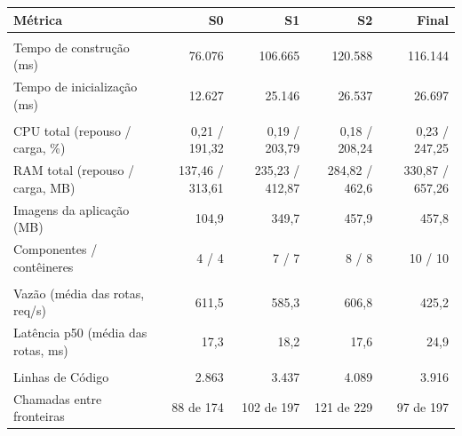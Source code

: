 \begin{quadro}[htb]
  \centering
  \caption{Leilões --- métricas por snapshot --- Subdomínio (DDD).}
  \label{qua:comp_auction_subdominio_snapshots}
  \renewcommand{\arraystretch}{1.15}
  \begin{tabularx}{\textwidth}{|>{\raggedright\arraybackslash}X|r|r|r|r|}
    \hline
    \textbf{Métrica} & \textbf{S0} & \textbf{S1} & \textbf{S2} & \textbf{Final} \\
    \hline
    \multicolumn{5}{|l|}{\textbf{Agilidade}} \\
    \hline
    Tempo de construção (ms) & 76.076 & 106.665 & 120.588 & 116.144 \\
    Tempo de inicialização (ms) & 12.627 & 25.146 & 26.537 & 26.697 \\
    \hline
    \multicolumn{5}{|l|}{\textbf{Custo}} \\
    \hline
    CPU total (repouso / carga, \%) & 0,21 / 191,32 & 0,19 / 203,79 & 0,18 / 208,24 & 0,23 / 247,25 \\
    RAM total (repouso / carga, MB) & 137,46 / 313,61 & 235,23 / 412,87 & 284,82 / 462,6 & 330,87 / 657,26 \\
    Imagens da aplicação (MB) & 104,9 & 349,7 & 457,9 & 457,8 \\
    Componentes / contêineres & 4 / 4 & 7 / 7 & 8 / 8 & 10 / 10 \\
    \hline
    \multicolumn{5}{|l|}{\textbf{Desempenho}} \\
    \hline
    Vazão (média das rotas, req/s) & 611,5 & 585,3 & 606,8 & 425,2 \\
    Latência p50 (média das rotas, ms) & 17,3 & 18,2 & 17,6 & 24,9 \\
    \hline
    \multicolumn{5}{|l|}{\textbf{Manutenibilidade}} \\
    \hline
    Linhas de Código & 2.863 & 3.437 & 4.089 & 3.916 \\
    Chamadas entre fronteiras & 88 de 174 & 102 de 197 & 121 de 229 & 97 de 197 \\
    \hline
  \end{tabularx}
\end{quadro}
